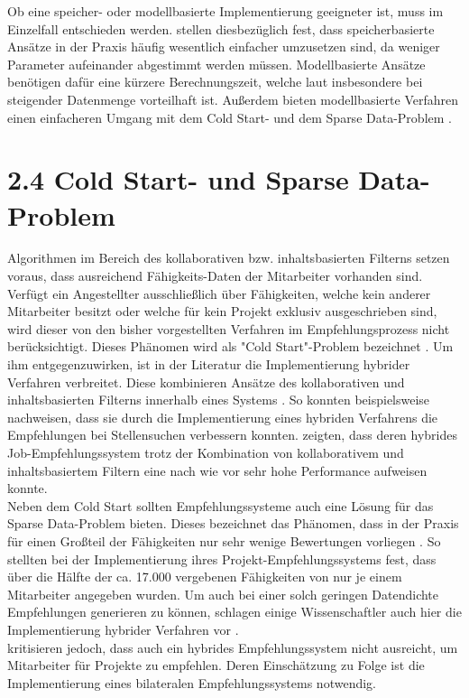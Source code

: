 Ob eine speicher- oder modellbasierte Implementierung geeigneter ist, muss im Einzelfall entschieden werden. \textcite[S. 4]{peerToPeer:2008} stellen diesbezüglich fest, dass speicherbasierte Ansätze in der Praxis häufig wesentlich einfacher umzusetzen sind, da weniger Parameter aufeinander abgestimmt werden müssen. Modellbasierte Ansätze benötigen dafür eine kürzere Berechnungszeit, welche laut \textcite[S. 2]{weightedSimilarity:2015} insbesondere bei steigender Datenmenge vorteilhaft ist. Außerdem bieten modellbasierte Verfahren einen einfacheren Umgang mit dem Cold Start- und dem Sparse Data-Problem \cite[S. 4]{peerToPeer:2008}.

\section[Cold Start- und Sparse Data-Problem]{2.4 Cold Start- und Sparse Data-Problem}
\label{ch:standDerForschung:coldStartUndSparseData}
Algorithmen im Bereich des kollaborativen bzw. inhaltsbasierten Filterns setzen voraus, dass ausreichend Fähigkeits-Daten der Mitarbeiter vorhanden sind. Verfügt ein Angestellter ausschließlich über Fähigkeiten, welche kein anderer Mitarbeiter besitzt oder welche für kein Projekt exklusiv ausgeschrieben sind, wird dieser von den bisher vorgestellten Verfahren im Empfehlungsprozess nicht berücksichtigt. Dieses Phänomen wird als "Cold Start"-Problem bezeichnet \cite[S. 1]{coldStart:2002}. Um ihm entgegenzuwirken, ist in der Literatur die Implementierung hybrider Verfahren verbreitet. Diese kombinieren Ansätze des kollaborativen und inhaltsbasierten Filterns innerhalb eines Systems \cite[S. 8]{malinowski:2008}. So konnten beispielsweise \textcite[S. 8]{combiningCbAndCFCostSensitiveApproach:2017} nachweisen, dass sie durch die Implementierung eines hybriden Verfahrens die Empfehlungen bei Stellensuchen verbessern konnten. \textcite[S. 16]{hybridImmunizing:2017} zeigten, dass deren hybrides Job-Empfehlungssystem trotz der Kombination von kollaborativem und inhaltsbasiertem Filtern eine nach wie vor sehr hohe Performance aufweisen konnte.\\
Neben dem Cold Start sollten Empfehlungssysteme auch eine Lösung für das Sparse Data-Problem bieten. Dieses bezeichnet das Phänomen, dass in der Praxis für einen Großteil der Fähigkeiten nur sehr wenige Bewertungen vorliegen \cite[S. 8]{recommenderSystems:2016}. So stellten \textcite[S. 3]{mitre:2014} bei der Implementierung ihres Projekt-Empfehlungssystems fest, dass über die Hälfte der ca. 17.000 vergebenen Fähigkeiten von nur je einem Mitarbeiter angegeben wurden. Um auch bei einer solch geringen Datendichte Empfehlungen generieren zu können, schlagen einige Wissenschaftler auch hier die Implementierung hybrider Verfahren vor \cite[S. 3]{weightedSimilarity:2015}.\\
\textcite[S. 1]{malinowski:2008} kritisieren jedoch, dass auch ein hybrides Empfehlungssystem nicht ausreicht, um Mitarbeiter für Projekte zu empfehlen. Deren Einschätzung zu Folge ist die Implementierung eines bilateralen Empfehlungssystems notwendig.


